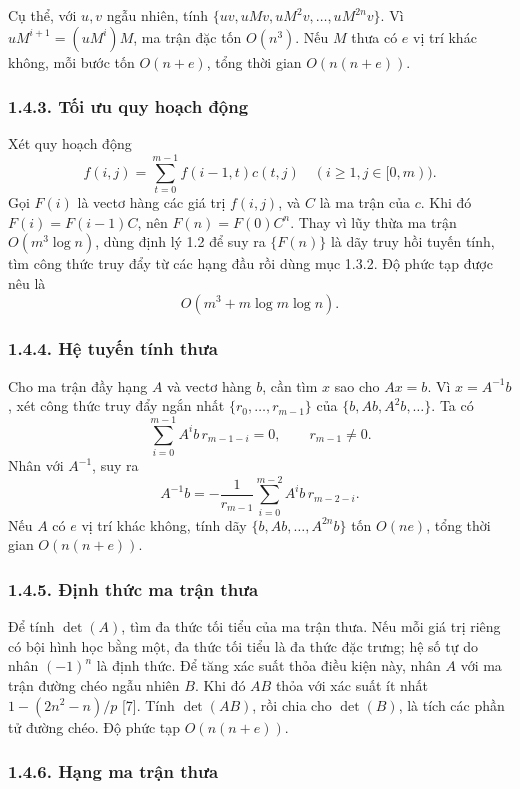 \documentclass[11pt]{article}
\begin{document}
Cụ thể, với \(u,v\) ngẫu nhiên, tính
\(\{uv,uMv,uM^2v,\ldots,uM^{2n}v\}\). Vì \(uM^{i+1}=(uM^i)M\), ma trận đặc
tốn \(O(n^3)\). Nếu \(M\) thưa có \(e\) vị trí khác không, mỗi bước tốn
\(O(n+e)\), tổng thời gian \(O(n(n+e))\).

\subsubsection*{1.4.3. Tối ưu quy hoạch động}

Xét quy hoạch động
\[
  f(i,j)=\sum_{t=0}^{m-1}f(i-1,t)c(t,j)\quad(i\ge1,j\in[0,m)).
\]
Gọi \(F(i)\) là vectơ hàng các giá trị \(f(i,j)\), và \(C\) là ma trận của
\(c\). Khi đó \(F(i)=F(i-1)C\), nên \(F(n)=F(0)C^n\). Thay vì lũy thừa ma trận
\(O(m^3\log n)\), dùng định lý 1.2 để suy ra \(\{F(n)\}\) là dãy truy hồi
tuyến tính, tìm công thức truy đẩy từ các hạng đầu rồi dùng mục 1.3.2. Độ
phức tạp được nêu là
\[
  O(m^3+m\log m\log n).
\]

\subsubsection*{1.4.4. Hệ tuyến tính thưa}

Cho ma trận đầy hạng \(A\) và vectơ hàng \(b\), cần tìm \(x\) sao cho \(Ax=b\).
Vì \(x=A^{-1}b\), xét công thức truy đẩy ngắn nhất
\(\{r_0,\ldots,r_{m-1}\}\) của \(\{b,Ab,A^2b,\ldots\}\). Ta có
\[
  \sum_{i=0}^{m-1}A^i b\,r_{m-1-i}=0,\qquad r_{m-1}\ne0.
\]
Nhân với \(A^{-1}\), suy ra
\[
  A^{-1}b=-\frac{1}{r_{m-1}}\sum_{i=0}^{m-2}A^i b\,r_{m-2-i}.
\]
Nếu \(A\) có \(e\) vị trí khác không, tính dãy \(\{b,Ab,\ldots,A^{2n}b\}\)
tốn \(O(ne)\), tổng thời gian \(O(n(n+e))\).

\subsubsection*{1.4.5. Định thức ma trận thưa}

Để tính \(\det(A)\), tìm đa thức tối tiểu của ma trận thưa. Nếu mỗi giá trị
riêng có bội hình học bằng một, đa thức tối tiểu là đa thức đặc trưng; hệ số
tự do nhân \((-1)^n\) là định thức. Để tăng xác suất thỏa điều kiện này, nhân
\(A\) với ma trận đường chéo ngẫu nhiên \(B\). Khi đó \(AB\) thỏa với xác suất
ít nhất \(1-(2n^2-n)/p\) [7]. Tính \(\det(AB)\), rồi chia cho
\(\det(B)\), là tích các phần tử đường chéo. Độ phức tạp \(O(n(n+e))\).

\subsubsection*{1.4.6. Hạng ma trận thưa}
\end{document}
